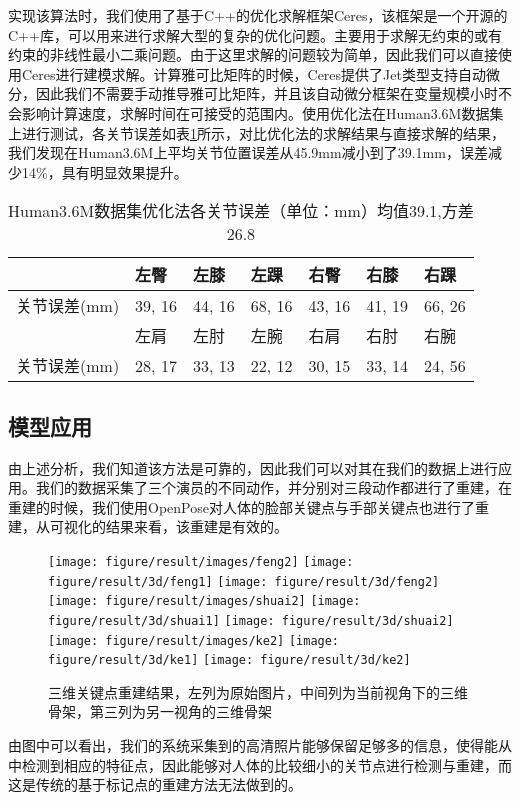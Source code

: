 实现该算法时，我们使用了基于C++的优化求解框架Ceres\cite{ceres-solver}，该框架是一个开源的C++库，可以用来进行求解大型的复杂的优化问题。主要用于求解无约束的或有约束的非线性最小二乘问题。由于这里求解的问题较为简单，因此我们可以直接使用Ceres进行建模求解。计算雅可比矩阵的时候，Ceres提供了Jet类型支持自动微分，因此我们不需要手动推导雅可比矩阵，并且该自动微分框架在变量规模小时不会影响计算速度，求解时间在可接受的范围内。使用优化法在Human3.6M数据集上进行测试，各关节误差如表\ref{tab:3derroropt}所示，对比优化法的求解结果与直接求解的结果，我们发现在Human3.6M上平均关节位置误差从45.9mm减小到了39.1mm，误差减少14\%，具有明显效果提升。

\begin{table}[H]
    \centering
    \begin{tabular}{lllllll}
        \hline
                     & 左臀  & 左膝  & 左踝  & 右臀  & 右膝  & 右踝  \\
        \hline
        关节误差(mm) & 39, 16 & 44, 16 & 68, 16 & 43, 16 & 41, 19 & 66, 26 \\
        \hline
                     & 左肩  & 左肘  & 左腕  & 右肩  & 右肘  & 右腕  \\
        关节误差(mm) & 28, 17 & 33, 13 & 22, 12 & 30, 15 & 33, 14 & 24, 56 \\
        \hline
    \end{tabular}
    \caption{Human3.6M数据集优化法各关节误差（单位：mm）均值39.1,方差26.8\label{tab:3derroropt}}
\end{table}


\subsection{模型应用}

由上述分析，我们知道该方法是可靠的，因此我们可以对其在我们的数据上进行应用。我们的数据采集了三个演员的不同动作，并分别对三段动作都进行了重建，在重建的时候，我们使用OpenPose对人体的脸部关键点与手部关键点也进行了重建，从可视化的结果来看，该重建是有效的。

\begin{figure}[H]
    \centering
    \texttt{[image: figure/result/images/feng2]} \hfill
    \texttt{[image: figure/result/3d/feng1]} \hfill
    \texttt{[image: figure/result/3d/feng2]} \hfill
    \texttt{[image: figure/result/images/shuai2]} \hfill
    \texttt{[image: figure/result/3d/shuai1]} \hfill
    \texttt{[image: figure/result/3d/shuai2]} \hfill
    \texttt{[image: figure/result/images/ke2]} \hfill
    \texttt{[image: figure/result/3d/ke1]} \hfill
    \texttt{[image: figure/result/3d/ke2]} 
    \caption{三维关键点重建结果，左列为原始图片，中间列为当前视角下的三维骨架，第三列为另一视角的三维骨架\label{fig:3djoint}}
\end{figure}

由图中可以看出，我们的系统采集到的高清照片能够保留足够多的信息，使得能从中检测到相应的特征点，因此能够对人体的比较细小的关节点进行检测与重建，而这是传统的基于标记点的重建方法无法做到的。

